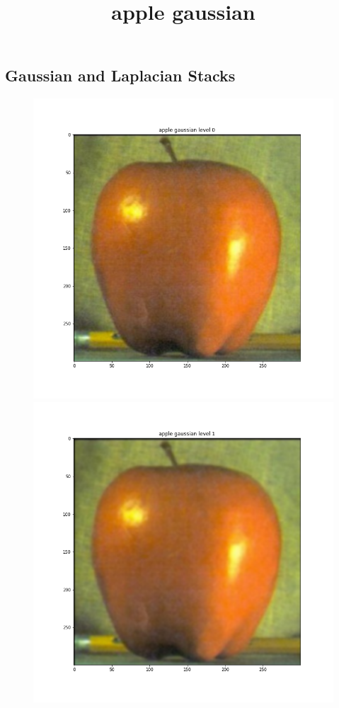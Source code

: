 \documentclass{article}
\begin{document}
\subsection{Gaussian and Laplacian Stacks}
\begin{figure}[!htb]
\title{apple gaussian}
    \includegraphics[width=\linewidth]{apple gaussian level 0.png}
\endminipage
{}
    \includegraphics[width=\linewidth]{apple gaussian level 1.png}

\end{figure}
\end{document}
